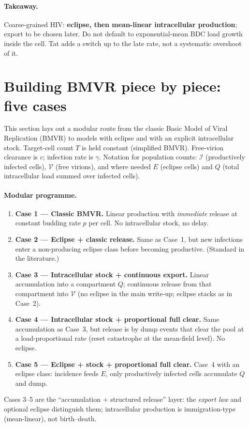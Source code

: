 \documentclass[11pt,a4paper]{article}
\newcommand{\Icell}{\mathcal{I}}
\newcommand{\Vfree}{\mathcal{V}}
\theoremstyle{plain}
\theoremstyle{definition}
\theoremstyle{remark}
\begin{document}
\paragraph{Takeaway.}
Coarse-grained HIV: \textbf{eclipse, then mean-linear intracellular production};
export to be chosen later. Do not default to exponential-mean BDC load growth
inside the cell. Tat adds a switch up to the late rate, not a systematic
overshoot of it.

\section{Building BMVR piece by piece: five cases}
\label{sec:bmvr-pieces}

This section lays out a modular route from the classic Basic Model of Viral
Replication (BMVR) to models with eclipse and with an explicit intracellular
stock. Target-cell count $T$ is held constant (simplified BMVR). Free-virion
clearance is $c$; infection rate is $\gamma$. Notation for population counts:
$\Icell$ (productively infected cells), $\Vfree$ (free virions), and where
needed $E$ (eclipse cells) and $Q$ (total intracellular load summed over
infected cells).

\paragraph{Modular programme.}
\begin{enumerate}
\item \textbf{Case 1 --- Classic BMVR.} Linear production with
\emph{immediate} release at constant budding rate $p$ per cell. No
intracellular stock, no delay.
\item \textbf{Case 2 --- Eclipse + classic release.} Same as Case~1, but new
infections enter a non-producing eclipse class before becoming productive.
(Standard in the literature.)
\item \textbf{Case 3 --- Intracellular stock + continuous export.} Linear
accumulation into a compartment $Q$; continuous release from that compartment
into $\Vfree$ (no eclipse in the main write-up; eclipse stacks as in Case~2).
\item \textbf{Case 4 --- Intracellular stock + proportional full clear.} Same
accumulation as Case~3, but release is by dump events that clear the pool at a
load-proportional rate (reset catastrophe at the mean-field level). No eclipse.
\item \textbf{Case 5 --- Eclipse + stock + proportional full clear.} Case~4
with an eclipse class: incidence feeds $E$, only productively infected cells
accumulate $Q$ and dump.
\end{enumerate}
Cases 3--5 are the ``accumulation + structured release'' layer: the
\emph{export law} and optional eclipse distinguish them; intracellular
production is immigration-type (mean-linear), not birth--death.
\end{document}
